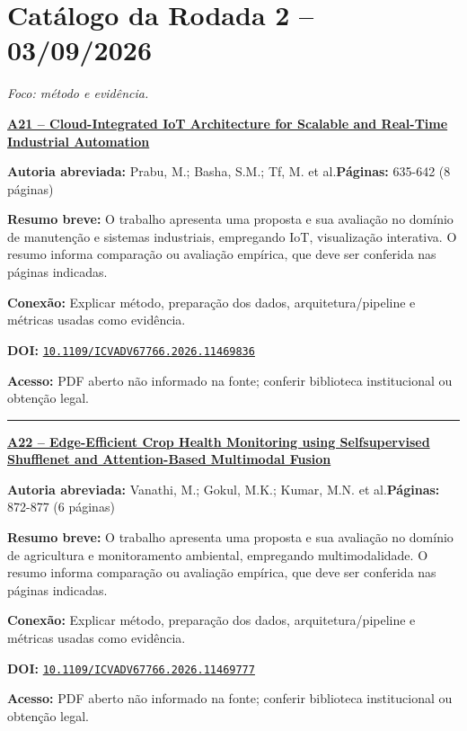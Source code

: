 \documentclass[10pt,a4paper]{article}
\begin{document}
\section*{Catálogo da Rodada 2 -- 03/09/2026}
\textit{Foco: método e evidência.}
\par\medskip\noindent
{\large\bfseries\href{https://doi.org/10.1109/ICVADV67766.2026.11469836}{A21 -- Cloud-Integrated IoT Architecture for Scalable and Real-Time Industrial Automation}}\par\smallskip
\textbf{Autoria abreviada:} Prabu, M.; Basha, S.M.; Tf, M. et al.\quad \textbf{Páginas:} 635-642 (8 páginas)\par
\textbf{Resumo breve:} O trabalho apresenta uma proposta e sua avaliação no domínio de manutenção e sistemas industriais, empregando IoT, visualização interativa. O resumo informa comparação ou avaliação empírica, que deve ser conferida nas páginas indicadas.\par
\textbf{Conexão:} Explicar método, preparação dos dados, arquitetura/pipeline e métricas usadas como evidência.\par
\textbf{DOI:} \href{https://doi.org/10.1109/ICVADV67766.2026.11469836}{\nolinkurl{10.1109/ICVADV67766.2026.11469836}}\par
\textbf{Acesso:} PDF aberto não informado na fonte; conferir biblioteca institucional ou obtenção legal.\par
\noindent\rule{\textwidth}{0.35pt}
\par\medskip\noindent
{\large\bfseries\href{https://doi.org/10.1109/ICVADV67766.2026.11469777}{A22 -- Edge-Efficient Crop Health Monitoring using Selfsupervised Shufflenet and Attention-Based Multimodal Fusion}}\par\smallskip
\textbf{Autoria abreviada:} Vanathi, M.; Gokul, M.K.; Kumar, M.N. et al.\quad \textbf{Páginas:} 872-877 (6 páginas)\par
\textbf{Resumo breve:} O trabalho apresenta uma proposta e sua avaliação no domínio de agricultura e monitoramento ambiental, empregando multimodalidade. O resumo informa comparação ou avaliação empírica, que deve ser conferida nas páginas indicadas.\par
\textbf{Conexão:} Explicar método, preparação dos dados, arquitetura/pipeline e métricas usadas como evidência.\par
\textbf{DOI:} \href{https://doi.org/10.1109/ICVADV67766.2026.11469777}{\nolinkurl{10.1109/ICVADV67766.2026.11469777}}\par
\textbf{Acesso:} PDF aberto não informado na fonte; conferir biblioteca institucional ou obtenção legal.\par
\end{document}
